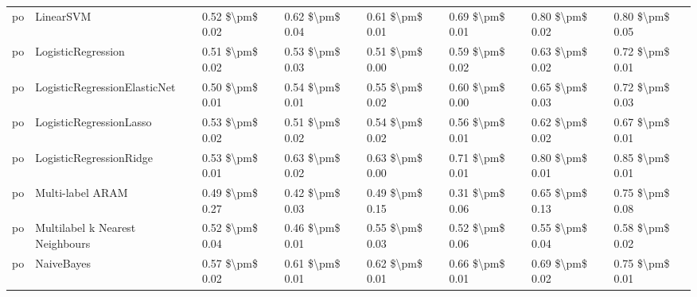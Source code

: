 \begin{tabular}{llllllll}
      po &                       LinearSVM &     0.52 \$\textbackslash pm\$ 0.02 &           0.62 \$\textbackslash pm\$ 0.04 &       0.61 \$\textbackslash pm\$ 0.01 &        0.69 \$\textbackslash pm\$ 0.01 &                         0.80 \$\textbackslash pm\$ 0.02 &     0.80 \$\textbackslash pm\$ 0.05 \\
      po &              LogisticRegression &     0.51 \$\textbackslash pm\$ 0.02 &           0.53 \$\textbackslash pm\$ 0.03 &       0.51 \$\textbackslash pm\$ 0.00 &        0.59 \$\textbackslash pm\$ 0.02 &                         0.63 \$\textbackslash pm\$ 0.02 &     0.72 \$\textbackslash pm\$ 0.01 \\
      po &    LogisticRegressionElasticNet &     0.50 \$\textbackslash pm\$ 0.01 &           0.54 \$\textbackslash pm\$ 0.01 &       0.55 \$\textbackslash pm\$ 0.02 &        0.60 \$\textbackslash pm\$ 0.00 &                         0.65 \$\textbackslash pm\$ 0.03 &     0.72 \$\textbackslash pm\$ 0.03 \\
      po &         LogisticRegressionLasso &     0.53 \$\textbackslash pm\$ 0.02 &           0.51 \$\textbackslash pm\$ 0.02 &       0.54 \$\textbackslash pm\$ 0.02 &        0.56 \$\textbackslash pm\$ 0.01 &                         0.62 \$\textbackslash pm\$ 0.02 &     0.67 \$\textbackslash pm\$ 0.01 \\
      po &         LogisticRegressionRidge &     0.53 \$\textbackslash pm\$ 0.01 &           0.63 \$\textbackslash pm\$ 0.02 &       0.63 \$\textbackslash pm\$ 0.00 &        0.71 \$\textbackslash pm\$ 0.01 &                         0.80 \$\textbackslash pm\$ 0.01 &     0.85 \$\textbackslash pm\$ 0.01 \\
      po &                Multi-label ARAM &     0.49 \$\textbackslash pm\$ 0.27 &           0.42 \$\textbackslash pm\$ 0.03 &       0.49 \$\textbackslash pm\$ 0.15 &        0.31 \$\textbackslash pm\$ 0.06 &                         0.65 \$\textbackslash pm\$ 0.13 &     0.75 \$\textbackslash pm\$ 0.08 \\
      po & Multilabel k Nearest Neighbours &     0.52 \$\textbackslash pm\$ 0.04 &           0.46 \$\textbackslash pm\$ 0.01 &       0.55 \$\textbackslash pm\$ 0.03 &        0.52 \$\textbackslash pm\$ 0.06 &                         0.55 \$\textbackslash pm\$ 0.04 &     0.58 \$\textbackslash pm\$ 0.02 \\
      po &                      NaiveBayes &     0.57 \$\textbackslash pm\$ 0.02 &           0.61 \$\textbackslash pm\$ 0.01 &       0.62 \$\textbackslash pm\$ 0.01 &        0.66 \$\textbackslash pm\$ 0.01 &                         0.69 \$\textbackslash pm\$ 0.02 &     0.75 \$\textbackslash pm\$ 0.01 \\

\end{tabular}
